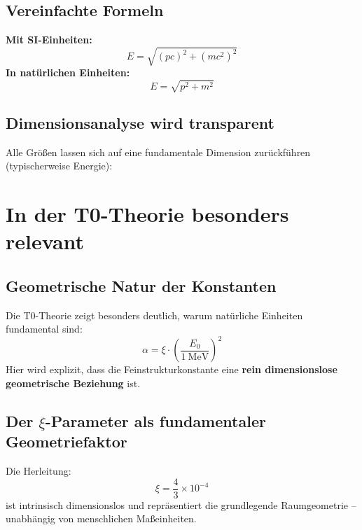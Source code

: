 	\subsection{Vereinfachte Formeln}
	\textbf{Mit SI-Einheiten:}
	\begin{equation}
		E = \sqrt{(p c)^2 + (m c^2)^2}
	\end{equation}
	\textbf{In natürlichen Einheiten:}
	\begin{equation}
		E = \sqrt{p^2 + m^2}
	\end{equation}
	
	\subsection{Dimensionsanalyse wird transparent}
	Alle Größen lassen sich auf eine fundamentale Dimension zurückführen (typischerweise Energie):
	\begin{table}[h]
		\centering
		\caption{Dimensionszusammenhänge in natürlichen Einheiten}
	\end{table}
	
	\section{In der T0-Theorie besonders relevant}
	
	\subsection{Geometrische Natur der Konstanten}
	Die T0-Theorie zeigt besonders deutlich, warum natürliche Einheiten fundamental sind:
	\begin{equation}
		\alpha = \xi \cdot \left( \frac{E_0}{1~\mathrm{MeV}} \right)^2
	\end{equation}
	Hier wird explizit, dass die Feinstrukturkonstante eine \textbf{rein dimensionslose geometrische Beziehung} ist.
	
	\subsection{Der $\xi$-Parameter als fundamentaler Geometriefaktor}
	Die Herleitung:
	\begin{equation}
		\xi = \frac{4}{3} \times 10^{-4}
	\end{equation}
	ist intrinsisch dimensionslos und repräsentiert die grundlegende Raumgeometrie -- unabhängig von menschlichen Maßeinheiten.
	
